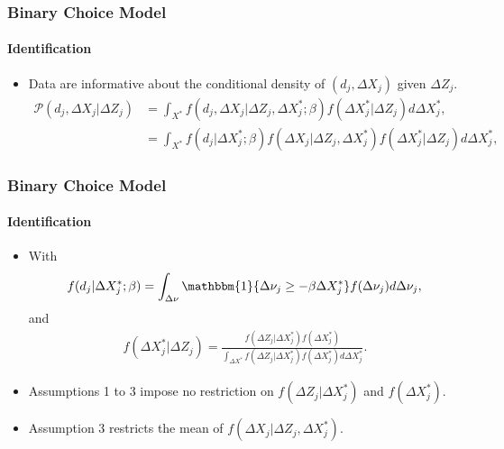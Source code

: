 \documentclass[notes=show]{beamer}
\begin{document}
\begin{frame}
\frametitle{Binary Choice Model}
\framesubtitle{Identification}

\begin{itemize}
	\item Data are informative about the conditional density of $(d_{j},\Delta X_{j})$ given $\Delta Z_{j}$. 
	\begin{align*}
	\mathcal{P}(d_{j},\Delta X_{j}|\Delta Z_{j})&=\int_{X^{*}}f(d_{j},\Delta X_{j}|\Delta Z_{j},\Delta X^{*}_{j};\beta)f(\Delta X^{*}_{j}|\Delta Z_{j})d\Delta X^{*}_{j},\\
	&=\int_{X^{*}}f(d_{j}|\Delta X^{*}_{j};\beta)f(\Delta X_{j}|\Delta Z_{j},\Delta X^{*}_{j})f(\Delta X^{*}_{j}|\Delta Z_{j})d\Delta X^{*}_{j},
	\end{align*}
\end{itemize}
\end{frame}

\begin{frame}
\frametitle{Binary Choice Model}
\framesubtitle{Identification}

\begin{itemize}
	\item With
	\begin{align*}
	f(d_{j}|\Delta X^{*}_{j};\beta)=\int_{\Delta\nu}\mathbbm{1}\{\Delta\nu_{j}\geq-\beta\Delta X^{*}_{j}\}f(\Delta\nu_{j})d\Delta\nu_{j},
	\end{align*}
	and
	\begin{align*}
	f(\Delta X^{*}_{j}|\Delta Z_{j})=\frac{f(\Delta Z_{j}|\Delta X^{*}_{j})f(\Delta X^{*}_{j})}{\int_{\Delta X^{*}}f(\Delta Z_{j}|\Delta X^{*}_{j})f(\Delta X^{*}_{j})d\Delta X^{*}_{j}}.
	\end{align*}
	\item Assumptions 1 to 3 impose no restriction on $f(\Delta Z_{j}|\Delta X^{*}_{j})$ and $f(\Delta X^{*}_{j})$.
	\item Assumption 3 restricts the mean of $f(\Delta X_{j}|\Delta Z_{j},\Delta X^{*}_{j})$.
\end{itemize}
\end{frame}
\end{document}
